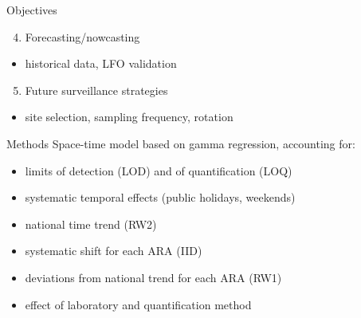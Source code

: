 \documentclass[
  ignorenonframetext,
]{beamer}
\providecommand{\tightlist}{%
  \setlength{\itemsep}{0pt}\setlength{\parskip}{0pt}}
\begin{document}
\begin{frame}{Objectives}
\protect\hypertarget{objectives-1}{}
\begin{enumerate}
\setcounter{enumi}{3}
\tightlist
\item
  Forecasting/nowcasting
\end{enumerate}

\begin{itemize}
\tightlist
\item
  historical data, LFO validation \pause\bigskip
\end{itemize}

\begin{enumerate}
\setcounter{enumi}{4}
\tightlist
\item
  Future surveillance strategies
\end{enumerate}

\begin{itemize}
\tightlist
\item
  site selection, sampling frequency, rotation
\end{itemize}
\end{frame}

\begin{frame}{Methods}
\protect\hypertarget{methods}{}
\alert{Space-time} model based on gamma regression, accounting for:

\begin{itemize}
\item
  limits of detection (LOD) and of quantification (LOQ)\pause
\item
  systematic temporal effects (public holidays, weekends) \pause
\item
  national \alert{time trend} (RW2)
\item
  \alert{systematic shift} for each ARA (IID)
\item
  deviations from national trend for each ARA (RW1) \pause
\item
  effect of \alert{laboratory} and quantification method
\end{itemize}
\end{frame}
\end{document}
